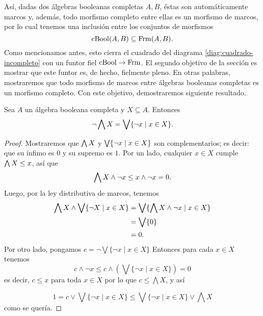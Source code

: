 Así, dadas dos álgebras booleanas completas $A,B$,
éstas son automáticamente marcos y, además, todo morfismo completo
entre ellas es un morfismo de marcos, por lo cual
tenemos una inclusión entre los conjuntos de morfismos
\[
  \mathrm{cBool}(A,B) \subseteq \mathrm{Frm}(A,B)
.\]
Como mencionamos antes, esto cierra el cuadrado del diagrama
\eqref{diag:cuadrado-incompleto} con un funtor fiel
$\mathrm{cBool}\to\mathrm{Frm}$.
El segundo objetivo de la sección es mostrar que este funtor
es, de hecho, fielmente pleno.
En otras palabras, mostraremos que todo morfismo de marcos entre
álgebras booleanas completas es un morfismo completo.
Con este objetivo, demostraremos siguiente resultado.

\begin{lemma}\label{demorgan}
  Sea $A$ un álgebra booleana completa y $X\subseteq A$.
  Entonces
  \[
    \neg \bigwedge X = \bigvee \{\neg x \mid x\in X\}
  .\]
\end{lemma}
\begin{proof}
  Mostraremos que
  $\bigwedge X$ y $\bigvee \{\neg x \mid x\in X\}$ son complementarios;
  es decir: que su ínfimo es $0$ y su supremo es $1$.
  Por un lado, cualquier $x\in X$ cumple $\bigwedge X\leq x$, así que
  \[
      \bigwedge X\wedge\neg x \leq x\wedge \neg x = 0.
  \]
  Luego, por la ley distributiva de marcos, tenemos
  \begin{align*}
      \bigwedge X \wedge \bigvee\{\neg X\mid x\in X\}
      &= \bigvee\{\bigwedge X \wedge \neg x\mid x\in X\} \\
      &= \bigvee\{0\} \\
      &= 0.
  \end{align*}
  Por otro lado, pongamos $c=\neg\bigvee\{\neg x\mid x\in X\}$
  Entonces para cada $x\in X$ tenemos \[c\wedge\neg x\leq c\wedge(\bigvee\{\neg x\mid x\in X\})=0 \]
  es decir, $c\leq x$ para toda $x\in X$ por lo que $c\leq\bigwedge X$,
  y así  
  
  \[1=c\vee \bigvee\{\neg x\mid x\in X\}\leq \bigvee\{\neg x\mid x\in X\}\vee\bigwedge X\]
  como se quería.
\end{proof}

